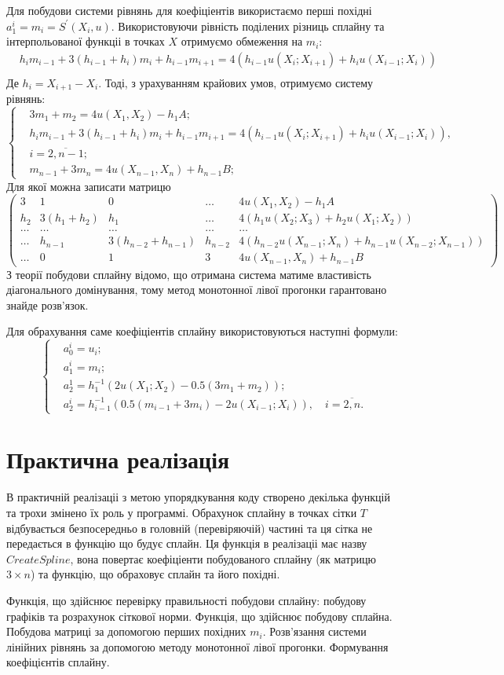 \documentclass[titlepage]{article}
\newcommand\makelisting[1]{\begingroup\spacing{1} \vspace{1cm} \endgroup}
\newcommand\mysection[1]{\begingroup\center\section*{#1}\endgroup}
\newcommand\eq[1]{\begin{equation*}\begin{split}#1\end{split}\end{equation*}}
\newcommand\eqc[1]{\begin{equation*}\begin{cases}#1\end{cases}\end{equation*}}
\begin{document}
Для побудови системи рівнянь для коефіціентів використаємо перші похідні $a_1^i = m_i = S^{'}(X_i, u)$. Використовуючи рівність поділених різниць сплайну та інтерпольованої функціі в точках $X$ отримуємо обмеження на $m_i$:
\eq{
&h_im_{i-1} + 3(h_{i-1} + h_i)m_i + h_{i-1}m_{i+1} = 4(h_{i-1}u(X_i; X_{i+1}) + h_iu(X_{i-1}; X_i))\\
}
Де $h_i = X_{i+1} - X_i$. Тоді, з урахуванням крайових умов, отримуємо систему рівнянь:
\eqc{
&3m_1 + m_2 = 4u(X_1, X_2)-h_1A;\\
&h_im_{i-1} + 3(h_{i-1} + h_i)m_i + h_{i-1}m_{i+1} = 4(h_{i-1}u(X_i; X_{i+1}) + h_iu(X_{i-1}; X_i)),\\
& i = \overline{2,n-1};\\
&m_{n-1} + 3m_n = 4u(X_{n-1}, X_n) + h_{n-1}B;
}
Для якої можна записати матрицю
\[\left(\begin{array}{cccc|c}
3 & 1 & 0 & \ldots  & 4u(X_1, X_2)-h_1A\\
h_2 & 3(h_1 + h_2) & h_1 & \ldots & 4(h_{1}u(X_2; X_{3}) + h_2u(X_{1}; X_2)) \\
\ldots &\ldots &\ldots &\ldots & \ldots\\
\ldots &h_{n-1} & 3(h_{n-2} + h_{n- 1}) & h_{n-2} & 4(h_{n-2}u(X_{n-1}; X_{n}) + h_{n-1}u(X_{n-2}; X_{n-1}))\\
 \ldots & 0  & 1 & 3 & 4u(X_{n-1}, X_n) + h_{n-1}B
\end{array}\right)\]
З теорії побудови сплайну відомо, що отримана система матиме властивість діагонального домінування, тому метод монотонної лівої прогонки гарантовано знайде розв'язок.

Для обрахування саме коефіціентів сплайну використовуються наступні формули:
\eqc{
&a_0^i = u_i;\\
&a_1^i = m_i;\\
&a_2^1 = h_1^{-1}(2u(X_1;X_2) - 0.5(3m_1+m_2));\\
&a_2^i = h_{i-1}^{-1}(0.5(m_{i-1}+3m_i) - 2u(X_{i-1}; X_i)), \quad i=\overline{2,n}.
}
\mysection{Практична реалізація}
В практичній реалізаціі з метою упорядкування коду створено декілька функцій та трохи змінено їх роль у программі. Обрахунок сплайну в точках сітки $T$ відбувається безпосередньо в головній (перевіряючій) частині та ця сітка не передається в функцію що будує сплайн. Ця функція в реалізаціі має назву $CreateSpline$, вона повертає коефіціенти побудованого сплайну (як матрицю $3\times n$) та функцію, що обраховує сплайн та його похідні. 

Функція, що здійснює перевірку правильності побудови сплайну: побудову графіків та розрахунок сіткової норми.
\makelisting{main.m}
Функція, що здійснює побудову сплайна.
\makelisting{CreateSpline.m}
Побудова матриці за допомогою перших похідних $m_i$.
\makelisting{CreateSEMatrix.m}
Розв'язання системи лінійних рівнянь за допомогою методу монотонної лівої прогонки.
\makelisting{SolveSE.m}
Формування коефіцієнтів сплайну.
\makelisting{FormSpline.m}
\end{document}
